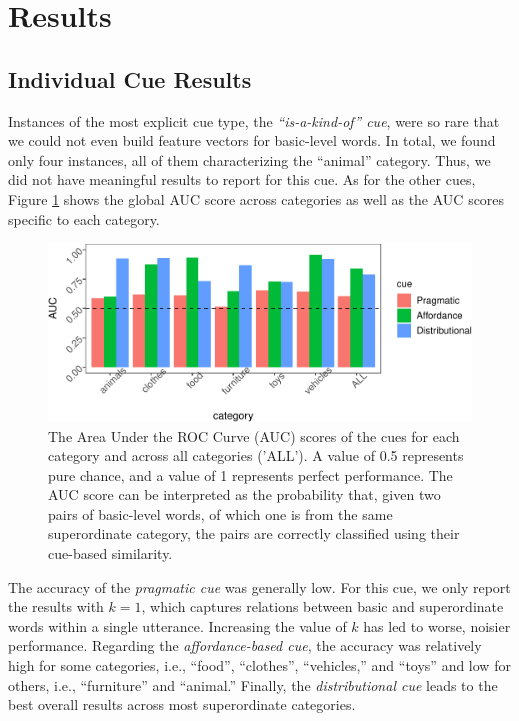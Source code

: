 \documentclass[english,,man]{apa6}
\begin{document}
\hypertarget{results}{%
\section{Results}\label{results}}

\hypertarget{individual-cue-results}{%
\subsection{Individual Cue Results}\label{individual-cue-results}}

Instances of the most explicit cue type, the \emph{\enquote{is-a-kind-of} cue}, were so rare that we could not even build feature vectors for basic-level words. In total, we found only four instances, all of them characterizing the \enquote{animal} category. Thus, we did not have meaningful results to report for this cue. As for the other cues, Figure \ref{fig:data-all} shows the global AUC score across categories as well as the AUC scores specific to each category.

\begin{figure}[h]

{\centering \includegraphics{child_language_journal_files/figure-latex/data-all-1} 

}

\caption{\label{fig:data-all} The Area Under the ROC Curve (AUC) scores of the cues for each category and across all categories ('ALL'). A value of 0.5 represents pure chance, and a value of 1 represents perfect performance. The AUC score can be interpreted as the probability that, given two pairs of basic-level words, of which one is from the same superordinate category, the pairs are correctly classified using their  cue-based similarity.}\label{fig:data-all}
\end{figure}

The accuracy of the \emph{pragmatic cue} was generally low. For this cue, we only report the results with \(k=1\), which captures relations between basic and superordinate words within a single utterance. Increasing the value of \(k\) has led to worse, noisier performance. Regarding the \emph{affordance-based cue}, the accuracy was relatively high for some categories, i.e., \enquote{food}, \enquote{clothes}, \enquote{vehicles,} and \enquote{toys} and low for others, i.e., \enquote{furniture} and \enquote{animal.} Finally, the \emph{distributional cue} leads to the best overall results across most superordinate categories.
\end{document}
